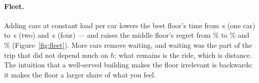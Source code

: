 \paragraph{Fleet.} Adding cars at constant load per car lowers the best
floor's time from \FleBestOne\,s (one car) to \FleBestTwo\,s (two) and
\FleBestFour\,s (four) --- and raises the middle floor's regret from
\FleRegMidOne\% to \FleRegMidTwo\% and \FleRegMidFour\%
(Figure~\ref{fig:fleet}). More cars remove waiting, and waiting was the part
of the trip that did not depend much on $h$; what remains is the ride, which
is distance. The intuition that a well-served building makes the floor
irrelevant is backwards: it makes the floor a larger share of what you feel.
